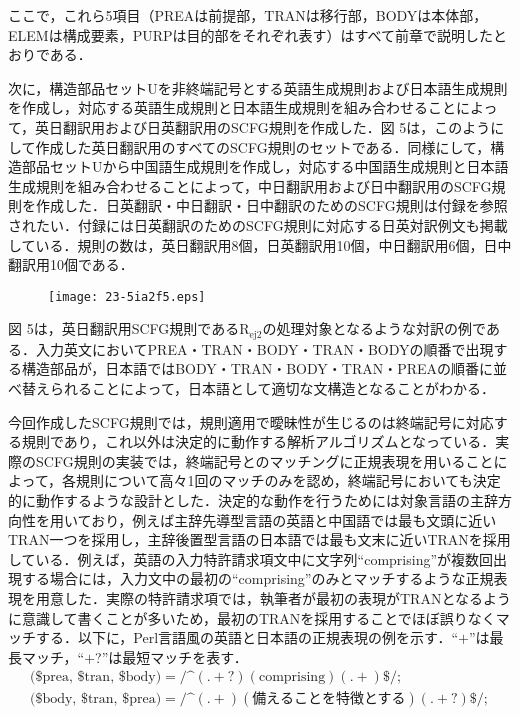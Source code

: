 \documentclass[japanese]{jnlp_1.4}
\begin{document}
ここで，これら5項目（PREAは前提部，TRANは移行部，BODYは本体部，ELEMは構成要素，PURPは目的部をそれぞれ表す）はすべて前章で説明したとおりである．

次に，構造部品セットUを非終端記号とする英語生成規則および日本語生成規則を作成し，対応する英語生成規則と日本語生成規則を組み合わせることによって，英日翻訳用および日英翻訳用のSCFG規則を作成した．図 
5は，このようにして作成した英日翻訳用のすべてのSCFG規則のセットである．同様にして，構造部品セットUから中国語生成規則を作成し，対応する中国語生成規則と日本語生成規則を組み合わせることによって，中日翻訳用および日中翻訳用のSCFG規則を作成した．日英翻訳・中日翻訳・日中翻訳のためのSCFG規則は付録を参照されたい．付録には日英翻訳のためのSCFG規則に対応する日英対訳例文も掲載している．規則の数は，英日翻訳用8個，日英翻訳用10個，中日翻訳用6個，日中翻訳用10個である．

\begin{figure}[b]
\begin{center}
\texttt{[image: 23-5ia2f5.eps]}
\end{center}
\label{fig05}
\end{figure}

図 5は，英日翻訳用SCFG規則であるR$_{\mathrm{ej}2}$の処理対象となるような対訳の例である．入力英文においてPREA・TRAN・BODY・TRAN・BODYの順番で出現する構造部品が，日本語ではBODY・TRAN・BODY・TRAN・PREAの順番に並べ替えられることによって，日本語として適切な文構造となることがわかる．

今回作成したSCFG規則では，規則適用で曖昧性が生じるのは終端記号に対応する規則であり，これ以外は決定的に動作する解析アルゴリズムとなっている．実際のSCFG規則の実装では，終端記号とのマッチングに正規表現を用いることによって，各規則について高々1回のマッチのみを認め，終端記号においても決定的に動作するような設計とした．決定的な動作を行うためには対象言語の主辞方向性を用いており，例えば主辞先導型言語の英語と中国語では最も文頭に近いTRAN一つを採用し，主辞後置型言語の日本語では最も文末に近いTRANを採用している．例えば，英語の入力特許請求項文中に文字列``comprising''が複数回出現する場合には，入力文中の最初の``comprising''のみとマッチするような正規表現を用意した．実際の特許請求項では，執筆者が最初の表現がTRANとなるように意識して書くことが多いため，最初のTRANを採用することでほぼ誤りなくマッチする．以下に，Perl言語風の英語と日本語の正規表現の例を示す．``$+$''は最長マッチ，``$+$?''は最短マッチを表す．
\begin{gather*}
\text{({\$}prea,\ {\$}tran,\ {\$}body)} = /\text{\textasciicircum} (.+?) (\text{comprising})  (.+){\$}/; \\
\text{({\$}body,\ {\$}tran,\ {\$}prea)} = /\text{\textasciicircum} (.+)  (\text{備えることを特徴とする})(.+?){\$}/;
\end{gather*}
\end{document}
